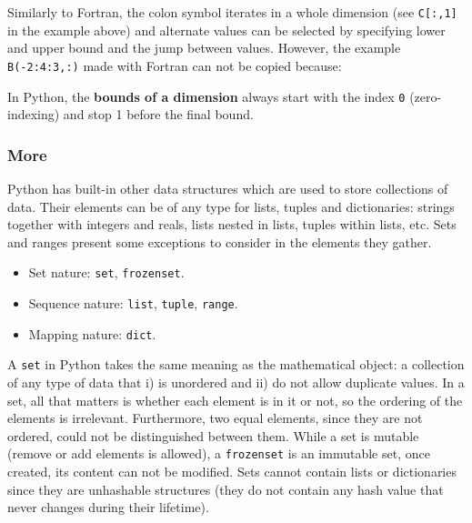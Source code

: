 Similarly to Fortran, the colon symbol iterates in a whole dimension (see \texttt{C[:,1]} in the example above) and 
alternate values can be selected by specifying lower and upper bound and the jump between values.
However, the example \texttt{B(-2:4:3,:)} made with Fortran can not be copied because:
\begin{IN}
In Python, the \textbf{bounds of a dimension} always start with the index \texttt{0} (zero-indexing) and
stop 1 before the final bound.  
\end{IN}







            \subsubsection*{More}

\vspace{0.5cm}
Python has built-in other data structures which are used to store collections of data.
Their elements can be of any type for lists, tuples and dictionaries: 
strings together with integers and reals, 
lists nested in lists, tuples within lists, etc. 
Sets and ranges present some exceptions to consider in the elements they gather.
\vspace{-.5cm}
\begin{itemize}[noitemsep]    
    \item Set nature: \texttt{set}, \texttt{frozenset}.
    \item Sequence nature: \texttt{list}, \texttt{tuple}, \texttt{range}.
    \item Mapping nature: \texttt{dict}.
\end{itemize}
\vspace{-.5cm}

A \texttt{set} in Python takes the same meaning as the mathematical object: a collection of any type of data that 
i) is unordered and 
ii) do not allow duplicate values. 
In a set, all that matters is whether each element is in it or not, so the ordering of the elements is irrelevant.
Furthermore, two equal elements, since they are not ordered, could not be distinguished between them. 
While a set is mutable (remove or add elements is allowed), a \texttt{frozenset} is an immutable set, once created, its content can not be modified. 
Sets cannot contain lists or dictionaries since they are unhashable structures (they do not contain any hash value that never changes during their lifetime).

